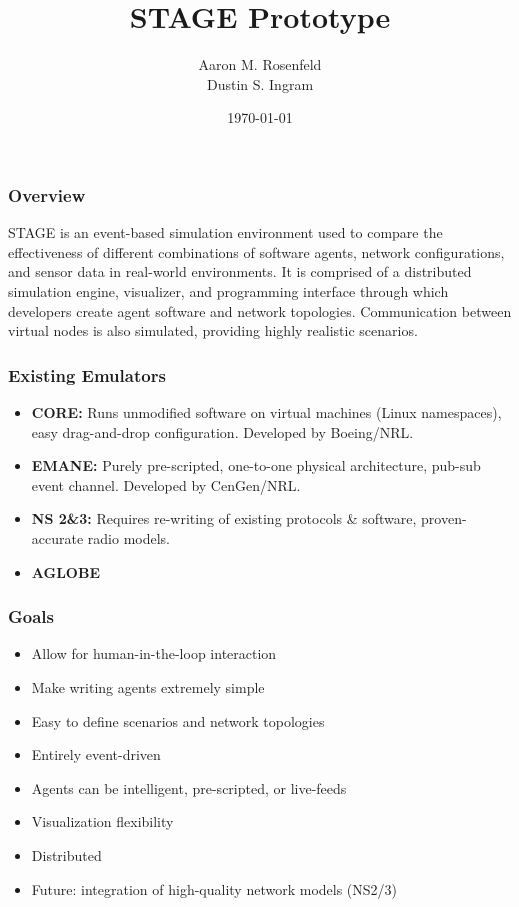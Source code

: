 \documentclass[mathserif]{beamer}
\title{STAGE Prototype}
\author{Aaron M. Rosenfeld \\ Dustin S. Ingram}
\date{\today}
\begin{document}
\frame{\titlepage}

\frame
{
    \frametitle{Overview}
    STAGE is an event-based simulation environment used to compare the
    effectiveness of different combinations of software agents, network
    configurations, and sensor data in real-world environments.  It is comprised of
    a distributed simulation engine, visualizer, and programming interface through
    which developers create agent software and network topologies.  Communication
    between virtual nodes is also simulated, providing highly realistic scenarios.
}

\frame
{
    \frametitle{Existing Emulators}

    \begin{itemize}
        \item \textbf{CORE:} Runs unmodified software on virtual machines (Linux namespaces), easy drag-and-drop configuration.  Developed by Boeing/NRL.
        \item \textbf{EMANE:} Purely pre-scripted, one-to-one physical architecture, pub-sub event channel.  Developed by CenGen/NRL.
        \item \textbf{NS 2\&3:} Requires re-writing of existing protocols \& software, proven-accurate radio models.
        \item \textbf{AGLOBE} 
    \end{itemize}
}

\frame
{
    \frametitle{Goals}
    \begin{itemize}
        \item Allow for human-in-the-loop interaction
        \item Make writing agents extremely simple
        \item Easy to define scenarios and network topologies
        \item Entirely event-driven
        \item Agents can be intelligent, pre-scripted, or live-feeds
        \item Visualization flexibility
        \item Distributed
        \item Future: integration of high-quality network models (NS2/3)
    \end{itemize}
}
\end{document}
